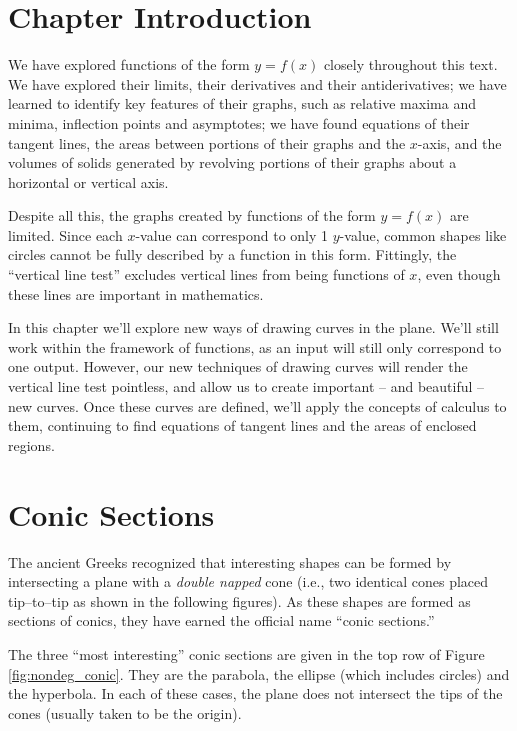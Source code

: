 \iflatexml\section*{Chapter Introduction}\fi

We have explored functions of the form $y=f(x)$ closely throughout this text. We have explored their limits, their derivatives and their antiderivatives; we have learned to identify key features of their graphs, such as relative maxima and minima, inflection points and asymptotes; we have found equations of their tangent lines, the areas between portions of their graphs and the $x$-axis, and the volumes of solids generated by revolving portions of their graphs about a horizontal or vertical axis.

Despite all this, the graphs created by functions of the form $y=f(x)$ are limited. Since each $x$-value can correspond to only 1 $y$-value, common shapes like circles cannot be fully described by a function in this form.  Fittingly, the ``vertical line test''  excludes vertical lines from being functions of $x$, even though these lines are important in mathematics.

In this chapter we'll explore new ways of drawing curves in the plane. We'll still work within the framework of functions, as an input will still only correspond to one output. However, our new techniques of drawing curves will render the vertical line test pointless, and allow us to create important -- and beautiful -- new curves. Once these curves are defined, we'll apply the concepts of calculus to them, continuing to find equations of tangent lines and the areas of enclosed regions. 


\section{Conic Sections}\label{sec:conic_sections}

The ancient Greeks recognized that interesting shapes can be formed by intersecting a plane with a 
\textit{double napped} cone (i.e., two identical cones placed tip--to--tip as shown in the following figures). As these shapes are formed as sections of conics, they have earned the official name ``conic sections.''

The three ``most interesting\primeskip'' conic sections are given in the top row of Figure \ref{fig:nondeg_conic}. They are the parabola, the ellipse (which includes circles) and the hyperbola. In each of these cases, the plane does not intersect the tips of the cones (usually taken to be the origin). \\

